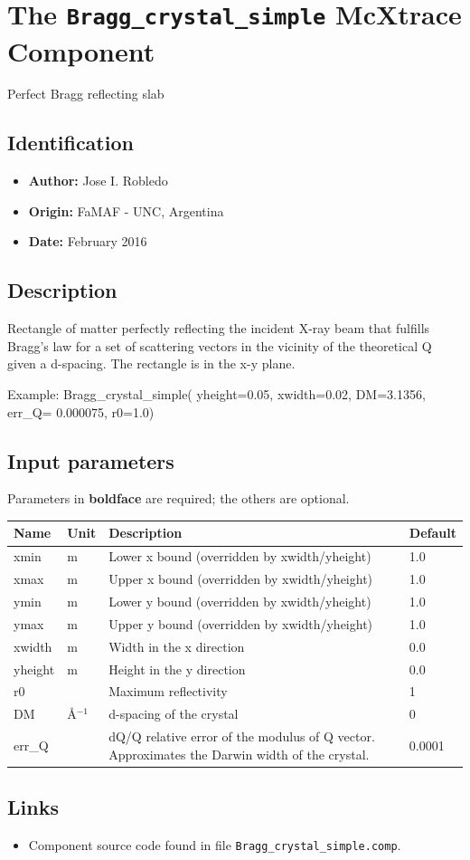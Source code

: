 \section{The \texttt{Bragg\_crystal\_simple} McXtrace Component}
Perfect Bragg reflecting slab

\subsection*{Identification}
\begin{itemize}
  \item \textbf{Author:} Jose I. Robledo
  \item \textbf{Origin:} FaMAF - UNC, Argentina
  \item \textbf{Date:} February 2016
\end{itemize}

\subsection*{Description}
Rectangle of matter perfectly reflecting the incident X-ray beam that fulfills Bragg's law for a set of scattering vectors in the vicinity of the theoretical Q given a d-spacing. The rectangle is in the x-y plane.

Example: Bragg\_crystal\_simple( yheight=0.05, xwidth=0.02, DM=3.1356, err\_Q= 0.000075, r0=1.0)

\subsection*{Input parameters}
Parameters in \textbf{boldface} are required; the others are optional.

\begin{longtable}{p{}p{}p{}p{}}
\toprule
\textbf{Name} & \textbf{Unit} & \textbf{Description} & \textbf{Default} \\
\midrule
\endhead
xmin & m & Lower x bound (overridden by xwidth/yheight) & 1.0 \\
xmax & m & Upper x bound (overridden by xwidth/yheight) & 1.0 \\
ymin & m & Lower y bound (overridden by xwidth/yheight) & 1.0 \\
ymax & m & Upper y bound (overridden by xwidth/yheight) & 1.0 \\
xwidth & m & Width in the x direction & 0.0 \\
yheight & m & Height in the y direction & 0.0 \\
r0 &   & Maximum reflectivity & 1 \\
DM & \AA{}$^{-1}$ & d-spacing of the crystal & 0 \\
err\_Q &   & dQ/Q relative error of the modulus of Q vector. Approximates the Darwin width of the crystal. & 0.0001 \\
\bottomrule
\end{longtable}

\subsection*{Links}
\begin{itemize}
  \item Component source code found in file \texttt{Bragg\_crystal\_simple.comp}.
\end{itemize}
